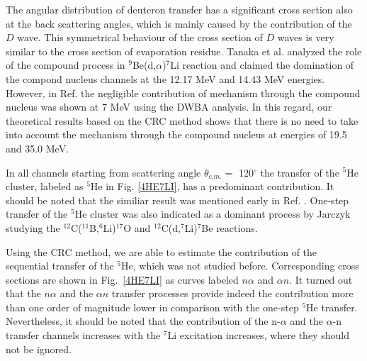 \documentclass[10pt]{iopart}
\begin{document}
The angular distribution of deuteron transfer has a significant cross section also at the back scattering angles, which is mainly caused by the contribution of the $D$ wave. This symmetrical behaviour of the cross section of $D$ waves is very similar to the cross section of evaporation residue. Tanaka et al. \cite{tanaka1978} analyzed the role of the compound process in ${}^9$Be(d,$\alpha$)${}^7$Li reaction and claimed the domination of the compond nucleus channels at the 12.17 MeV and 14.43 MeV energies. However, in Ref. \cite{bodek1989} the negligible contribution of mechanism through the compound nucleus was shown at 7 MeV using the DWBA analysis. In this regard, our theoretical results based on the CRC method shows that there is no need to take into account the mechanism through the compound nucleus at energies of 19.5 and 35.0 MeV.

In all channels starting from scattering angle $\theta_{c.m.} =$ 120$^\circ$ the transfer of the ${}^5$He cluster, labeled as ${}^5$He in Fig. \ref{4HE7LI}, has a predominant contribution. It should be noted that the similiar result was mentioned early in Ref. \cite{bodek1989}. One-step transfer of the ${}^5$He cluster was also indicated as a dominant process by Jarczyk \etal \cite{jarczyk1996} studying the ${}^{12}$C(${}^{11}$B,${}^6$Li)${}^{17}$O and ${}^{12}$C(d,${}^7$Li)${}^{7}$Be reactions.

Using the CRC method, we are able to estimate the contribution of the sequential transfer of the ${}^5$He, which was not studied before. Corresponding cross sections are shown in Fig.~\ref{4HE7LI} as curves labeled $n\alpha$ and $\alpha n$.
It turned out that the $n\alpha$ and the $\alpha n$ transfer processes provide indeed the contribution more than one order of magnitude lower in comparison with the one-step ${}^5$He transfer. Nevertheless, it should be noted that the contribution of the n-$\alpha$ and the $\alpha$-n transfer channels increases with the ${}^7$Li excitation increases, where they should not be ignored.
\end{document}
